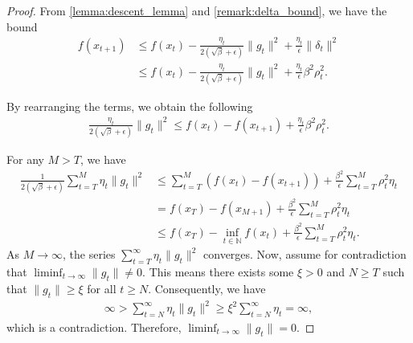 \begin{proof}
    From \cref{lemma:descent_lemma} and \cref{remark:delta_bound}, we have the bound
    \begin{align*}
        f(x_{t+1}) &\leq f(x_t) - \frac{\eta_t}{2(\sqrt{\beta} + \epsilon)} \|g_t\|^2 + \frac{\eta_t}{\epsilon} \|\delta_t\|^2 \\
        &\leq f(x_t) - \frac{\eta_t}{2(\sqrt{\beta} + \epsilon)} \|g_t\|^2 + \frac{\eta_t}{\epsilon} \beta^2 \rho_t^2.
    \end{align*}
    
    By rearranging the terms, we obtain the following
    \begin{align*}
        \frac{\eta_t}{2(\sqrt{\beta} + \epsilon)} \|g_t\|^2 \leq f(x_t) - f(x_{t+1}) + \frac{\eta_t}{\epsilon} \beta^2 \rho_t^2.
    \end{align*}
    
    For any $M > T$, we have
    \begin{align*}
    \frac{1}{2(\sqrt{\beta} + \epsilon)} \sum_{t=T}^M \eta_t \|g_t\|^2 &\leq \sum_{t=T}^M \left(f(x_t) - f(x_{t+1})\right) + \frac{\beta^2}{\epsilon} \sum_{t=T}^M \rho_t^2 \eta_t \\
    &= f(x_T) - f(x_{M+1}) + \frac{\beta^2}{\epsilon} \sum_{t=T}^{M} \rho_t^2 \eta_t \\
    &\leq f(x_T) - \inf_{t \in \mathbb{N}} f(x_t) + \frac{\beta^2}{\epsilon} \sum_{t=T}^{M} \rho_t^2 \eta_t.
    \end{align*}
    As \( M \to \infty \), the series \( \sum_{t=T}^{\infty} \eta_t \|g_t\|^2 \) converges. Now, assume for contradiction that \( \liminf_{t \to \infty} \|g_t\| \neq 0 \). This means there exists some \( \xi > 0 \) and \( N \geq T \) such that \( \|g_t\| \geq \xi \) for all \( t \geq N \). Consequently, we have
    \begin{align*}
        \infty > \sum_{t=N}^{\infty} \eta_t \|g_t\|^2 \geq \xi^2 \sum_{t=N}^{\infty} \eta_t = \infty,    
    \end{align*}
    which is a contradiction. Therefore, \( \liminf_{t \to \infty} \|g_t\| = 0 \).
\end{proof}
